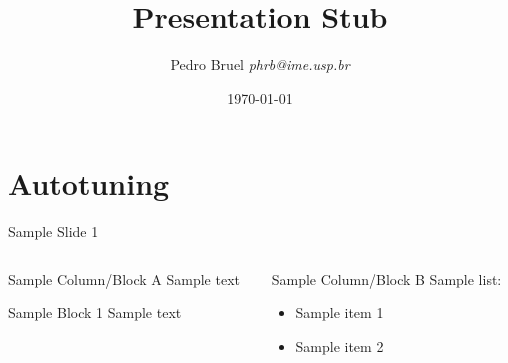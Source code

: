 \documentclass[10pt, compress, aspectratio=169, xcolor={table,usenames,dvipsnames}]{beamer}
\author{\footnotesize Pedro Bruel \newline \scriptsize \emph{phrb@ime.usp.br}}
\date{\scriptsize \today}
\title{Presentation Stub}
\begin{document}
\maketitle


\section{Autotuning}
\label{sec:orge93c9a7}
\begin{frame}[label={sec:org0ef2526}]{Sample Slide 1}
\begin{columns}
\begin{column}{0.5\columnwidth}
\begin{block}{Sample Column/Block A}
Sample text

\begin{block}{Sample Block 1}
Sample \alert{text}
\end{block}
\end{block}
\end{column}

\begin{column}{0.5\columnwidth}
\begin{block}{Sample Column/Block B}
Sample list:

\begin{itemize}
\item Sample item 1
\item Sample item 2
\end{itemize}
\end{block}
\end{column}
\end{columns}
\end{frame}
\maketitle
\end{document}
